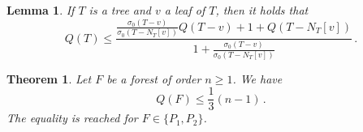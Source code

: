 \documentclass[10pt,a4paper]{amsart}
\newtheorem{thm}{Theorem}
\newtheorem{lem}{Lemma}
\begin{document}
	\begin{lem}\label{Lem:2}
		If $T$ is a tree and $v$ a leaf of $T$, then it holds that
		\begin{equation*}
			Q(T)\leq \frac{\displaystyle\frac{\sigma_0\left(T-v\right)}{\sigma_0\left(T-N_T[v]\right)}Q(T-v)+1+Q\left(T-N_T[v]\right)}{1+\displaystyle\frac{\sigma_0\left(T-v\right)}{\sigma_0\left(T-N_T[v]\right)}}\,.
		\end{equation*}
	\end{lem}

	\begin{thm}\label{MaxForest}
		Let $F$ be a forest of order $n\geq 1$. We have
        \begin{equation*}
			Q(F)\leq \frac{1}{3}\left(n-1\right)\,.
		\end{equation*}
The equality is reached for $F\in \{P_1,P_2\}$.
	\end{thm}
\end{document}
